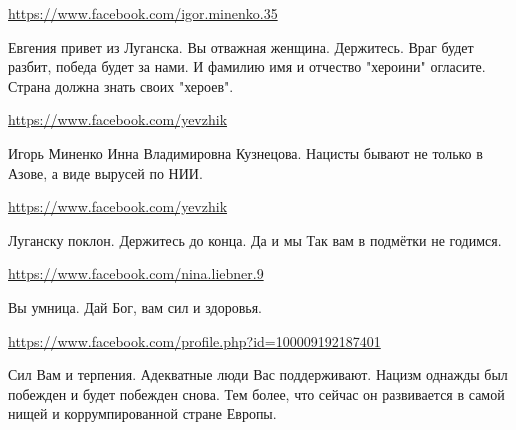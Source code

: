 \documentclass[a4paper,11pt]{extreport}
\begin{document}
\begin{itemize}
\url{https://www.facebook.com/igor.minenko.35}

Евгения привет из Луганска. Вы отважная женщина. Держитесь. Враг будет разбит, победа будет за нами. И фамилию имя и отчество "хероини" огласите. Страна должна знать своих "хероев".

\begin{itemize}
\url{https://www.facebook.com/yevzhik}

Игорь Миненко Инна Владимировна Кузнецова. Нацисты бывают не только в Азове, а виде вырусей по НИИ.

\url{https://www.facebook.com/yevzhik}

Луганску поклон. Держитесь до конца. Да и мы Так вам в подмётки не годимся.

\end{itemize}
\url{https://www.facebook.com/nina.liebner.9}

Вы умница. Дай Бог, вам сил и здоровья. 🌹

\url{https://www.facebook.com/profile.php?id=100009192187401}

Сил Вам и терпения. Адекватные люди Вас поддерживают. Нацизм однажды был побежден и будет побежден снова. Тем более, что сейчас он развивается в самой нищей и коррумпированной стране Европы.

\end{itemize}
\end{document}
